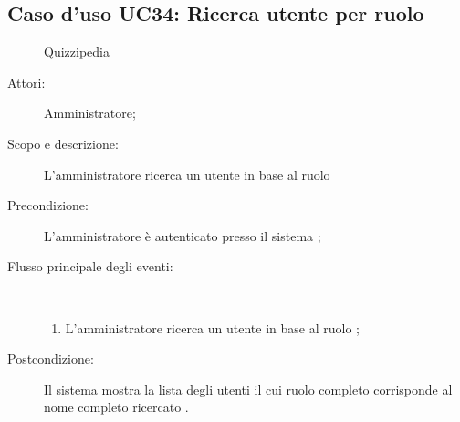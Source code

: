 \subsection{Caso d'uso UC34: Ricerca utente per ruolo}
	\begin{figure}[H]
		\centering
		\begin{resizedtikzpicture}{\textwidth}
		\begin{umlsystem}[x=0, fill=lightgray!20]{Quizzipedia}
		\end{umlsystem}
		\end{resizedtikzpicture}
		\caption{}
	\end{figure}
\begin{description}
\item[Attori:] Amministratore;
\item[Scopo e descrizione:] L'amministratore ricerca un utente in base al ruolo 

      \item[Precondizione:] L'amministratore è autenticato presso il sistema
;

        \item[Flusso principale degli eventi:] \ 
 \begin{enumerate}
          \item L'amministratore ricerca un utente in base al ruolo 
;

      \end{enumerate}
    \item[Postcondizione:] Il sistema mostra la lista degli utenti il cui ruolo completo corrisponde al nome completo ricercato
.
  \end{description}
\hypertarget{UC35}{}
